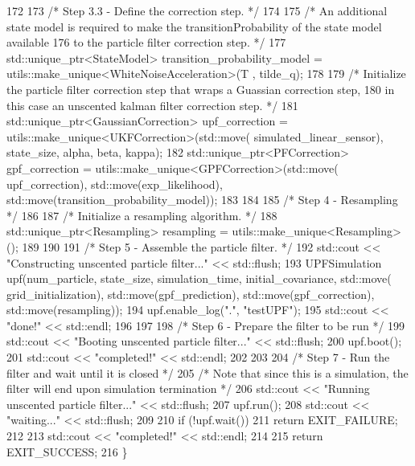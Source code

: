 \begin{DoxyCodeInclude}
172 
173     \textcolor{comment}{/* Step 3.3 - Define the correction step. */}
174 
175     \textcolor{comment}{/* An additional state model is required to make the transitionProbability of the state model available}
176 \textcolor{comment}{       to the particle filter correction step. */}
177     std::unique\_ptr<StateModel> transition\_probability\_model = utils::make\_unique<WhiteNoiseAcceleration>(T
      , tilde\_q);
178 
179     \textcolor{comment}{/* Initialize the particle filter correction step that wraps a Guassian correction step,}
180 \textcolor{comment}{       in this case an unscented kalman filter correction step. */}
181     std::unique\_ptr<GaussianCorrection> upf\_correction = utils::make\_unique<UKFCorrection>(std::move(
      simulated\_linear\_sensor), state\_size, alpha, beta, kappa);
182     std::unique\_ptr<PFCorrection> gpf\_correction = utils::make\_unique<GPFCorrection>(std::move(
      upf\_correction), std::move(exp\_likelihood), std::move(transition\_probability\_model));
183 
184 
185     \textcolor{comment}{/* Step 4 - Resampling */}
186 
187     \textcolor{comment}{/* Initialize a resampling algorithm. */}
188     std::unique\_ptr<Resampling> resampling = utils::make\_unique<Resampling>();
189 
190 
191     \textcolor{comment}{/* Step 5 - Assemble the particle filter. */}
192     std::cout << \textcolor{stringliteral}{"Constructing unscented particle filter..."} << std::flush;
193     UPFSimulation upf(num\_particle, state\_size, simulation\_time, initial\_covariance, std::move(
      grid\_initialization), std::move(gpf\_prediction), std::move(gpf\_correction), std::move(resampling));
194     upf.enable\_log(\textcolor{stringliteral}{"."}, \textcolor{stringliteral}{"testUPF"});
195     std::cout << \textcolor{stringliteral}{"done!"} << std::endl;
196 
197 
198     \textcolor{comment}{/* Step 6 - Prepare the filter to be run */}
199     std::cout << \textcolor{stringliteral}{"Booting unscented particle filter..."} << std::flush;
200     upf.boot();
201     std::cout << \textcolor{stringliteral}{"completed!"} << std::endl;
202 
203 
204     \textcolor{comment}{/* Step 7 - Run the filter and wait until it is closed */}
205     \textcolor{comment}{/* Note that since this is a simulation, the filter will end upon simulation termination */}
206     std::cout << \textcolor{stringliteral}{"Running unscented particle filter..."} << std::flush;
207     upf.run();
208     std::cout << \textcolor{stringliteral}{"waiting..."} << std::flush;
209 
210     \textcolor{keywordflow}{if} (!upf.wait())
211         \textcolor{keywordflow}{return} EXIT\_FAILURE;
212 
213     std::cout << \textcolor{stringliteral}{"completed!"} << std::endl;
214 
215     \textcolor{keywordflow}{return} EXIT\_SUCCESS;
216 \}
\end{DoxyCodeInclude}
 